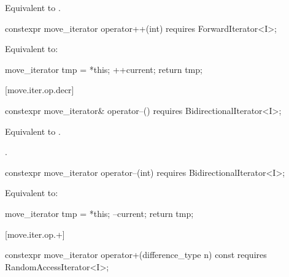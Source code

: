\begin{itemdescr}
\pnum
\effects Equivalent to .
\end{itemdescr}

\begin{itemdecl}
constexpr move_iterator operator++(int)
  requires ForwardIterator<I>;
\end{itemdecl}

\begin{itemdescr}
\pnum
\effects Equivalent to:
\begin{codeblock}
move_iterator tmp = *this;
++current;
return tmp;
\end{codeblock}
\end{itemdescr}

[move.iter.op.decr]{}

%
%
\begin{itemdecl}
constexpr move_iterator& operator--()
  requires BidirectionalIterator<I>;
\end{itemdecl}

\begin{itemdescr}
\pnum
\effects Equivalent to .

\pnum
\returns {}.
\end{itemdescr}

%
%
\begin{itemdecl}
constexpr move_iterator operator--(int)
  requires BidirectionalIterator<I>;
\end{itemdecl}

\begin{itemdescr}
\pnum
\effects Equivalent to:
\begin{codeblock}
move_iterator tmp = *this;
--current;
return tmp;
\end{codeblock}
\end{itemdescr}

[move.iter.op.+]{}

%
%
\begin{itemdecl}
constexpr move_iterator operator+(difference_type n) const
  requires RandomAccessIterator<I>;
\end{itemdecl}

